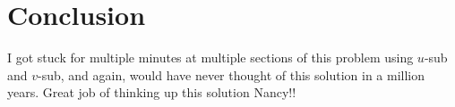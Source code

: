 \documentclass[letterpaper, 12pt]{article}
\begin{document}
\section{Conclusion}
I got stuck for multiple minutes at multiple sections of this problem using $u$-sub and $v$-sub, and again, would have never thought of this solution in a million years. Great job of thinking up this solution Nancy!!
\end{document}
